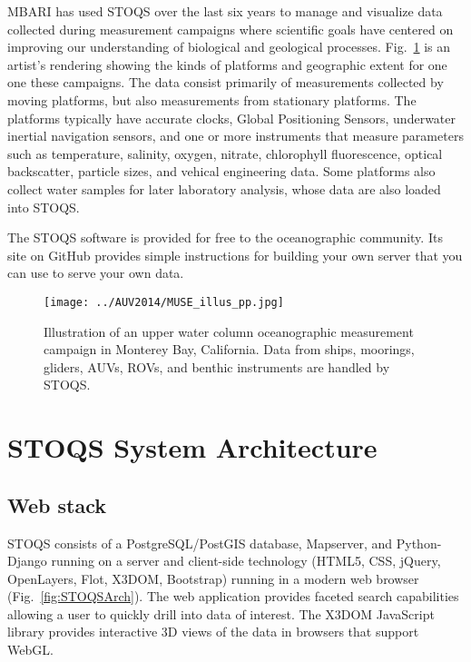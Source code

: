 \documentclass[conference]{IEEEtran}
\begin{document}
MBARI has used STOQS over the last six years to manage and visualize data collected 
during measurement campaigns where scientific goals have centered on improving 
our understanding of biological and geological processes. Fig.~\ref{fig:MUSE_illus_pp} 
is an artist's rendering showing the kinds of platforms and geographic extent for one one 
these campaigns.  The data consist primarily of measurements 
collected by moving platforms, but also measurements from stationary platforms. 
The platforms typically have accurate clocks, Global Positioning 
Sensors, underwater inertial navigation sensors, and one or more instruments that measure 
parameters such as temperature, salinity, oxygen, nitrate, chlorophyll fluorescence, 
optical backscatter, particle sizes, and vehical engineering data. Some platforms also collect
water samples for later laboratory analysis, whose data are also loaded into STOQS. 

The STOQS software is provided for free to the oceanographic community. Its site on
GitHub \cite{stoqs_github} provides simple instructions for building your own server that
you can use to serve your own data.

\begin{figure}[htbp]
\centering
\texttt{[image: ../AUV2014/MUSE\_illus\_pp.jpg]}
\caption{Illustration of an upper water column oceanographic measurement campaign in Monterey Bay, California. 
Data from ships, moorings, gliders, AUVs, ROVs, and benthic instruments are handled by STOQS.}
\label{fig:MUSE_illus_pp}
\end{figure}

\section{STOQS System Architecture}

\subsection{Web stack}

STOQS consists of a PostgreSQL/PostGIS database, Mapserver, and Python-Django 
running on a server and client-side technology (HTML5, CSS, jQuery, OpenLayers, Flot,
X3DOM, Bootstrap) running in a modern web browser (Fig.~\ref{fig:STOQSArch}). 
The web application provides faceted search capabilities allowing a user to quickly 
drill into data of interest. The X3DOM JavaScript library provides interactive 
3D views of the data in browsers that support WebGL.  
\end{document}
